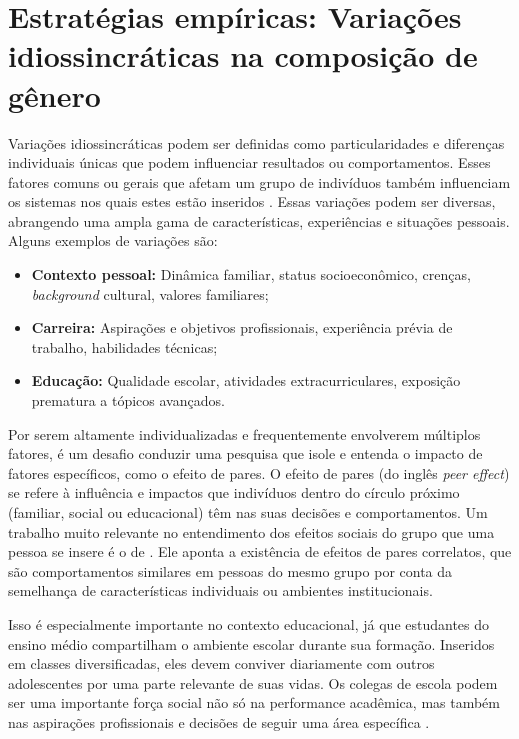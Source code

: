 \section{Estratégias empíricas: Variações idiossincráticas na composição de gênero}
Variações idiossincráticas podem ser definidas como particularidades e diferenças individuais únicas que podem influenciar resultados ou comportamentos. Esses fatores comuns ou gerais que afetam um grupo de indivíduos também influenciam os sistemas nos quais estes estão inseridos \autocite{Meister1991}. Essas variações podem ser diversas, abrangendo uma ampla gama de características, experiências e situações pessoais. Alguns exemplos de variações são:

\begin{itemize}
  \item \textbf{Contexto pessoal:} Dinâmica familiar, status socioeconômico, crenças, \textit{background} cultural, valores familiares;
  \item \textbf{Carreira:} Aspirações e objetivos profissionais, experiência prévia de trabalho, habilidades técnicas; 
  \item \textbf{Educação:} Qualidade escolar, atividades extracurriculares, exposição prematura a tópicos avançados. 
\end{itemize}

Por serem altamente individualizadas e frequentemente envolverem múltiplos fatores, é um desafio conduzir uma pesquisa que isole e entenda o impacto de fatores específicos, como o efeito de pares. O efeito de pares (do inglês \textit{peer effect}) se refere à influência e impactos que indivíduos dentro do círculo próximo (familiar, social ou educacional) têm nas suas decisões e comportamentos. Um trabalho muito relevante no entendimento dos efeitos sociais do grupo que uma pessoa se insere é o de \citet{Manski1993}. Ele aponta a existência de efeitos de pares correlatos, que são comportamentos similares em pessoas do mesmo grupo por conta da semelhança de características individuais ou ambientes institucionais.

Isso é especialmente importante no contexto educacional, já que estudantes do ensino médio compartilham o ambiente escolar durante sua formação. Inseridos em classes diversificadas, eles devem conviver diariamente com outros adolescentes por uma parte relevante de suas vidas. Os colegas de escola podem ser uma importante força social não só na performance acadêmica, mas também nas aspirações profissionais e decisões de seguir uma área específica \autocite{Tang2008}.  


